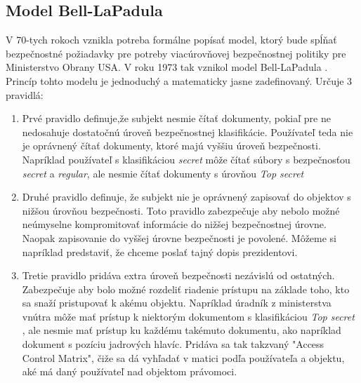 \subsection{Model Bell-LaPadula} 
V 70-tych rokoch vznikla potreba formálne popísať model, ktorý bude spĺňať bezpečnostné požiadavky pre potreby viacúrovňovej bezpečnostnej politiky pre Ministerstvo Obrany USA.
V roku 1973 tak vznikol model Bell-LaPadula \cite{bell-lapadula} . Princíp tohto modelu je jednoduchý  a matematicky jasne zadefinovaný. Určuje 3 pravidlá: 
\begin{enumerate}
	\item Prvé pravidlo definuje,že subjekt nesmie čítať dokumenty, pokiaľ pre ne nedosahuje dostatočnú úroveň bezpečnostnej klasifikácie. Používateľ teda nie je oprávnený čítať dokumenty, ktoré majú vyššiu úroveň bezpečnosti. Napríklad používateľ s klasifikáciou  \emph{secret} môže čítať súbory s bezpečnosťou \emph{secret} a  \emph{regular}, ale nesmie čítať dokumenty s úrovňou  \emph{Top secret}
	\item Druhé pravidlo definuje, že subjekt nie je oprávnený zapisovať do objektov s nižšou úrovňou bezpečnosti. Toto pravidlo zabezpečuje aby nebolo možné neúmyselne kompromitovať informácie do nižšej bezpečnostnej úrovne. Naopak zapisovanie do vyššej úrovne bezpečnosti je povolené. Môžeme si napríklad predstaviť, že chceme poslať tajný dopis prezidentovi. 
	\item Tretie pravidlo pridáva extra úroveň bezpečnosti nezávislú od ostatných. Zabezpečuje aby bolo možné rozdeliť riadenie prístupu na základe toho, kto sa snaží pristupovať k akému objektu. Napríklad úradník z ministerstva vnútra môže mať prístup k niektorým dokumentom s klasifikáciou \emph{Top secret} , ale nesmie mať prístup ku každému takémuto dokumentu, ako napríklad dokument s pozíciu jadrových hlavíc. Pridáva sa tak  takzvaný "Access Control Matrix", čiže sa dá vyhľadať v matici podľa používateľa a objektu, aké má daný používateľ nad objektom právomoci.
\end{enumerate}









